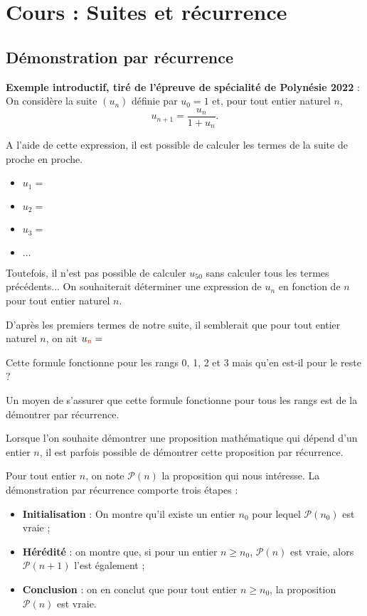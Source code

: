 \documentclass[11pt,fleqn]{book} %
\begin{document}
\chapter{Cours : Suites et récurrence}

\section{Démonstration par récurrence}

\textbf{Exemple introductif, tiré de l'épreuve de spécialité de Polynésie 2022} : On considère la suite \((u_n)\) définie par \(u_0=1\) et, pour tout entier naturel \(n\), \[u_{n+1}=\dfrac{u_n}{1+u_n}.\]

A l'aide de cette expression, il est possible de calculer les termes de la suite de proche en proche.
\begin{itemize}
\item \(u_1 = \)
\vskip5pt
\item \(u_2=  \)
\vskip5pt
\item \(u_3= \)
\vskip5pt
\item \(\ldots\)
\end{itemize}

Toutefois, il n'est pas possible de calculer \(u_{50}\) sans calculer tous les termes précédents... On souhaiterait déterminer une expression de \(u_n\) en fonction de \(n\) pour tout entier naturel \(n\).

D'après les premiers termes de notre suite, il semblerait que pour tout entier naturel \(n\), on ait \(u_{\color{red}{n}}=\) 

Cette formule fonctionne pour les rangs 0, 1, 2 et 3 mais qu'en est-il pour le reste ? 

Un moyen de s'assurer que cette formule fonctionne pour tous les rangs est de la démontrer par récurrence.

\begin{definition}Lorsque l'on souhaite démontrer une proposition mathématique qui dépend d'un entier $n$, il est parfois possible de démontrer cette proposition par récurrence.

Pour tout entier $n$, on note $\mathcal{P}(n)$ la proposition qui nous intéresse. La démonstration par récurrence comporte trois étapes :
\begin{itemize}
\item \textbf{Initialisation} : On montre qu'il existe un entier $n_0$ pour lequel $\mathcal{P}(n_0)$ est vraie ;
\item \textbf{Hérédité} : on montre que, si pour un entier $n\geqslant n_0$, $\mathcal{P}(n)$ est vraie, alors $\mathcal{P}(n+1)$ l'est également ;
\item \textbf{Conclusion} : on en conclut que pour tout entier $n\geqslant n_0$, la proposition $\mathcal{P}(n)$ est vraie.
\end{itemize}\end{definition}
\end{document}
